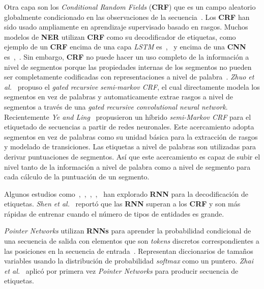 Otra capa son los \emph{Conditional Random Fields} (\textbf{CRF}) que es un campo aleatorio globalmente condicionado en las observaciones de la secuencia~\cite{lafferty2001conditional}. Los \textbf{CRF} han sido usado ampliamente en aprendizaje supervisado basado en rasgos. Muchos modelos de \textbf{NER} utilizan \textbf{CRF} como su decodificador de etiquetas, como ejemplo de un \textbf{CRF} encima de una capa \emph{LSTM} es~\cite{huang2015bidirectional},~\cite{peters2018deep} y encima de una \textbf{CNN} es~\cite{collobert2011natural},~\cite{yao2015biomedical}. Sin embargo, \textbf{CRF} no puede hacer un uso completo de la informaci\'on a nivel de segmentos porque las propiedades internas de los segmentos no pueden ser completamente codificadas con representaciones a nivel de palabra~\cite{li2018survey}. \emph{Zhuo et al.}~\cite{zhuo2016segment} propuso el \emph{gated recursive semi-markov CRF}, el cual directamente modela los segmentos en vez de palabras y automaticamente extrae rasgos a nivel de segmentos a trav\'es de una \emph{gated recursive convolutional neural network}. Recientemente \emph{Ye and Ling}~\cite{ye2018hybrid} propusieron un h\'ibrido \emph{semi-Markov CRF} para el etiquetado de secuencias a partir de redes neuronales. Este acercamiento adopta segmentos en vez de palabras como su unidad b\'asica para la extracci\'on de rasgos y modelado de transiciones. Las etiquetas a nivel de palabras son utilizadas para derivar puntuaciones de segmentos. As\'i que este acercamiento es capaz de subir el nivel tanto de la informaci\'on a nivel de palabra como a nivel de segmento para cada c\'alculo de la puntuaci\'on de un segmento.

Algunos estudios como~\cite{shen2017deep},~\cite{nguyen2016toward},~\cite{zheng2017joint},~\cite{zhou2017joint},~\cite{vaswani2016supertagging} han explorado \textbf{RNN} para la decodificaci\'on de etiquetas. \emph{Shen et al.}~\cite{shen2017deep} report\'o que las \textbf{RNN} superan a los \textbf{CRF} y son m\'as r\'apidas de entrenar cuando el n\'umero de tipos de entidades es grande.

\emph{Pointer Networks} utilizan \textbf{RNNs} para aprender la probabilidad condicional de una secuencia de salida con elementos que son \emph{tokens} discretos correspondientes a las posiciones en la secuencia de entrada~\cite{vinyals2015pointer}. Representan diccionarios de tama\~nos variables usando la distribuci\'on de probabilidad \emph{softmax} como un puntero. \emph{Zhai et al.}~\cite{zhai2017neural} aplic\'o por primera vez \emph{Pointer Networks} para producir secuencia de etiquetas. 


